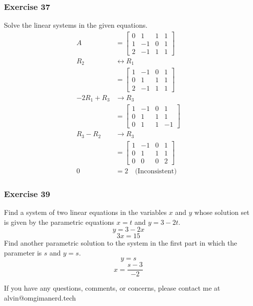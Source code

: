 \documentclass[letterpaper, 12pt]{math}
\begin{document}
\subsubsection*{Exercise 37}
Solve the linear systems in the given equations.
\begin{align*}
  A &= \left[\begin{array}{ccc|c}
    0 & 1 & 1 & 1 \\
    1 & -1 & 0 & 1 \\
    2 & -1 & 1 & 1
  \end{array}\right] \\
  R_2 &\leftrightarrow R_1 \\
  &= \left[\begin{array}{ccc|c}
    1 & -1 & 0 & 1 \\
    0 & 1 & 1 & 1 \\
    2 & -1 & 1 & 1
  \end{array}\right] \\
  -2R_1+R_3 &\to R_3 \\
  &= \left[\begin{array}{ccc|c}
    1 & -1 & 0 & 1 \\
    0 & 1 & 1 & 1 \\
    0 & 1 & 1 & -1
  \end{array}\right] \\
  R_3-R_2 &\to R_3 \\
  &= \left[\begin{array}{ccc|c}
    1 & -1 & 0 & 1 \\
    0 & 1 & 1 & 1 \\
    0 & 0 & 0 & 2
  \end{array}\right] \\
  0 &= 2 \quad \text{(Inconsistent)}
\end{align*}

\subsubsection*{Exercise 39}
Find a system of two linear equations in the variables \( x \) and \( y \)
whose solution set is given by the parametric equations \( x = t \) and
\( y = 3-2t \).
\[ y = 3-2x \]
\[ 3x = 15 \]
Find another parametric solution to the system in the first part in which
the parameter is \( s \) and \( y = s \).
\[ y = s \]
\[ x = \frac{s-3}{-2} \]

\begin{center}
  If you have any questions, comments, or concerns, please contact me at
  alvin@omgimanerd.tech
\end{center}
\end{document}
